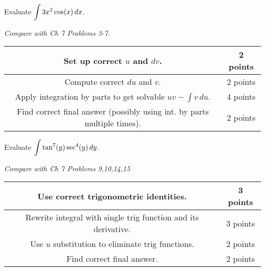 \documentclass[12pt]{exam}
\newcommand{\ds}{\ensuremath{\displaystyle}}
\begin{document}
\begin{questions}
\vfill

\newpage

\question[10]
Evaluate $\ds\int 3x^2\cos(x)\,dx$.

\textit{Compare with Ch 7 Problems 3-7.}

\begin{center}
  \begin{tabular}{|c|c|}
    \hline
    Set up correct $u$ and $dv$. & 2 points \\
    \hline
    Compute correct $du$ and $v$. & 2 points \\
    \hline
    Apply integration by parts to get solvable $uv-\int v\,du$. & 4 points \\
    \hline
    Find correct final answer (possibly using int. by parts
    multiple times). & 2 points \\
    \hline
  \end{tabular}
\end{center}

\vfill

\newpage

\question[10]
Evaluate $\ds\int \tan^7(y)\sec^4(y)\,dy$.

\textit{Compare with Ch 7 Problems 9,10,14,15}

\begin{center}
  \begin{tabular}{|c|c|}
    \hline
    Use correct trigonometric identities. & 3 points \\
    \hline
    Rewrite integral with single trig function and its derivative. & 3 points \\
    \hline
    Use $u$ substitution to eliminate trig functions. & 2 points \\
    \hline
    Find correct final answer. & 2 points \\
    \hline
  \end{tabular}
\end{center}

\vfill





\end{questions}
\end{document}
